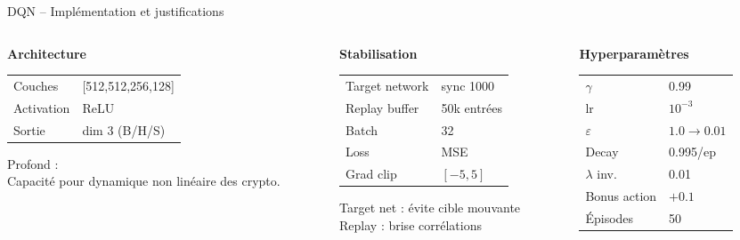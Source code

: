\documentclass[11pt,aspectratio=169]{beamer}
\begin{document}
\begin{frame}{DQN -- Implémentation et justifications}

\begin{columns}[T]

\begin{column}{0.32\textwidth}
\small
\textbf{Architecture}

\vspace{0.1cm}
\begin{tabular}{@{}ll@{}}
\toprule
Couches & {[512,512,256,128]} \\
Activation & ReLU \\
Sortie & dim 3 (B/H/S) \\
\bottomrule
\end{tabular}
\vspace{0.2cm}

\alert{Profond :}\\
Capacité pour dynamique non linéaire des crypto.
\end{column}

\begin{column}{0.32\textwidth}
\small
\textbf{Stabilisation}

\vspace{0.1cm}
\begin{tabular}{@{}ll@{}}
\toprule
Target network & sync 1000 \\
Replay buffer & 50k entrées \\
Batch & 32 \\
Loss & MSE \\
Grad clip & $[-5,5]$ \\
\bottomrule
\end{tabular}
\vspace{0.2cm}

\alert{Target net :} évite cible mouvante\\
\alert{Replay :} brise corrélations
\end{column}

\begin{column}{0.32\textwidth}
\small
\textbf{Hyperparamètres}

\vspace{0.1cm}
\begin{tabular}{@{}ll@{}}
\toprule
$\gamma$ & 0.99 \\
lr & $10^{-3}$ \\
$\varepsilon$ & $1.0\!\to\!0.01$ \\
Decay & 0.995/ep \\
$\lambda$ inv. & 0.01 \\
Bonus action & $+0.1$ \\
Épisodes & 50 \\
\bottomrule
\end{tabular}
\vspace{0.2cm}


\end{column}
\end{columns}
\end{frame}
\end{document}

